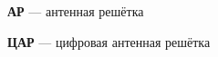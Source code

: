 
{
\noindent \textbf{АР} --- антенная решётка

\noindent \textbf{ЦАР} --- цифровая антенная решётка
}